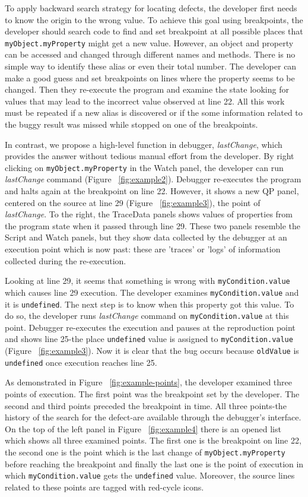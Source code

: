 \documentclass[preprint]{sigplanconf}
\begin{document}
To apply backward search strategy for locating defects, the developer
first needs to know the origin to the wrong value. To achieve this
goal using breakpoints, the developer should search code to find and
set breakpoint at all possible places that
\texttt{myObject.myProperty} might get a new value.  However, an
object and property can be accessed and changed through different
names and methods. There is no simple way to identify these alias or
even their total number.  The developer can make a good guess and set
breakpoints on lines where the property seems to be changed. Then they
re-execute the program and examine the state looking for values that
may lead to the incorrect value observed at line 22. All this work
must be repeated if a new alias is discovered or if the some
information related to the buggy result was missed while stopped on
one of the breakpoints.

In contrast, we propose a high-level function in debugger,
\textit{lastChange}, which provides the answer without tedious manual
effort from the developer. By right clicking on
\texttt{myObject.myProperty} in the Watch panel, the developer can run
\textit{lastChange} command (Figure ~\ref{fig:example2}). Debugger
re-executes the program and halts again at the breakpoint on line 22.
However, it shows a new QP panel, centered on the source at line 29
(Figure ~\ref{fig:example3}), the point of \textit{lastChange}.  To
the right, the TraceData panels shows values of properties from the
program state when it passed through line 29.  These two panels
resemble the Script and Watch panels, but they show data collected by
the debugger at an execution point which is now past: these are
'traces' or 'logs' of information collected during the re-execution.

Looking at line 29, it seems that something is wrong with
\texttt{myCondition.value} which causes line 29 execution. The
developer examines \texttt{myCondition.value} and it is
\texttt{undefined}. The next step is to know when this property got
this value. To do so, the developer runs \textit{lastChange} command
on \texttt{myCondition.value} at this point. Debugger re-executes the
execution and pauses at the reproduction point and shows line 25-the
place \texttt{undefined} value is assigned to
\texttt{myCondition.value} (Figure ~\ref{fig:example3}). Now it is
clear that the bug occurs because \texttt{oldValue} is
\texttt{undefined} once execution reaches line 25.


As demonstrated in Figure ~\ref{fig:example-points}, the developer
examined three points of execution. The first point was the breakpoint set by the developer.
The second and third points preceded the breakpoint in time.
All three points-the history
of the search for the defect-are available through the debugger's
interface. On the top of the left panel in Figure ~\ref{fig:example4}
there is an opened list which shows all three examined points. The
first one is the breakpoint on line 22, the second one is the point
which is the last change of \texttt{myObject.myProperty} before
reaching the breakpoint and finally the last one is the point of
execution in which \texttt{myCondition.value} gets the
\texttt{undefined} value. Moreover, the source lines related to these
points are tagged with red-cycle icons.
\end{document}
